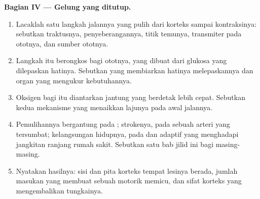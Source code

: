 \begin{problem}
\medskip
\noindent\textbf{Bagian IV --- Gelung yang ditutup.}
\begin{enumerate}[resume]
  \item Lacaklah satu langkah jalannya yang pulih dari korteks sampai
        kontraksinya: sebutkan traktusnya, penyeberangannya, titik
        temunya, transmiter pada ototnya, dan sumber  ototnya.
  \item Langkah itu berongkos  bagi ototnya, yang dibuat dari
        glukosa yang dilepaskan hatinya. Sebutkan  yang
        membiarkan hatinya melepaskannya dan organ yang mengukur
        kebutuhannya.
  \item Oksigen bagi  itu diantarkan jantung yang berdetak lebih
        cepat. Sebutkan kedua mekanisme yang menaikkan lajunya pada
        awal jalannya.
  \item Pemulihannya bergantung pada ; strokenya, pada
        sebuah arteri yang tersumbat; kelangsungan hidupnya, pada
         dan adaptif yang menghadapi jangkitan ranjang
        rumah sakit. Sebutkan satu bab jilid ini bagi masing-masing.
  \item Nyatakan hasilnya: sisi dan pita korteks tempat lesinya
        berada, jumlah masukan yang membuat sebuah  motorik
        memicu, dan sifat korteks yang mengembalikan tungkainya.
\end{enumerate}
\end{problem}
